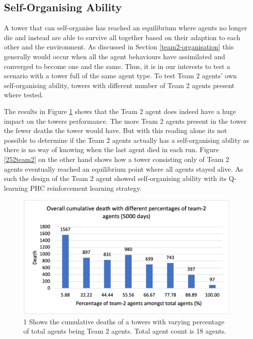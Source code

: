 \subsection{Self-Organising Ability}
A tower that can self-organise has reached an equilibrium where agents no longer die and instead are able to survive all together based on their adaption to each other and the environment. As discussed in Section \ref{team2-organisation} this generally would occur when all the agent behaviours have assimilated and converged to become one and the same. Thus, it is in our interests to test a scenario with a tower full of the same agent type. To test Team 2 agents’ own self-organising ability, towers with different number of Team 2 agents present where tested.

The results in Figure \ref{251team2} shows that the Team 2 agent does indeed have a huge impact on the towers performance. The more Team 2 agents present in the tower the fewer deaths the tower would have. But with this reading alone its not possible to determine if the Team 2 agents actually has a self-organising ability as there is no way of knowing when the last agent died in each run. Figure \ref{252team2} on the other hand shows how a tower consisting only of Team 2 agents eventually reached an equilibrium point where all agents stayed alive. As such the design of the Team 2 agent showed self-organising ability with its Q-learning PHC reinforcement learning strategy.

\begin{figure}
\centering
\includegraphics{004_team_2_agent_design/251team2}
\caption{1 Shows the cumulative deaths of a towers with varying percentage of total agents being Team 2 agents. Total agent count is 18 agents.}
\label{251team2}
\end{figure}

